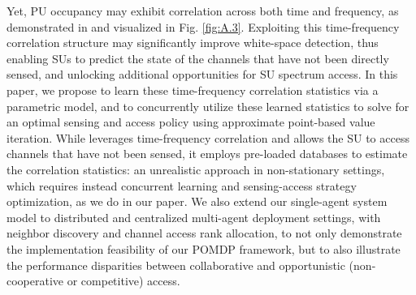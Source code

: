 \documentclass[12pt, draftcls, onecolumn]{IEEEtran}
\begin{document}
Yet, PU occupancy may exhibit  correlation across both time and frequency, as demonstrated in \cite{WCL:12} and visualized in Fig. \ref{fig:A.3}. Exploiting this time-frequency correlation structure may significantly improve white-space detection, thus enabling SUs to predict the state of the channels that have not been directly sensed, and unlocking additional opportunities for SU spectrum access.
In this paper, we propose to learn these time-frequency correlation statistics via a parametric model, and to concurrently utilize these learned statistics to solve for an optimal sensing and access policy using approximate point-based value iteration. While \cite{WCL:7} leverages time-frequency correlation and allows the SU to access channels that have not been sensed, it employs pre-loaded databases to estimate the correlation statistics: an unrealistic approach in non-stationary settings, which requires instead concurrent learning and sensing-access strategy optimization, as we do in our paper. We also extend our single-agent system model to distributed and centralized multi-agent deployment settings, with neighbor discovery and channel access rank allocation, to not only demonstrate the implementation feasibility of our POMDP framework, but to also illustrate the performance disparities between collaborative and opportunistic (non-cooperative or competitive) access.
\end{document}
